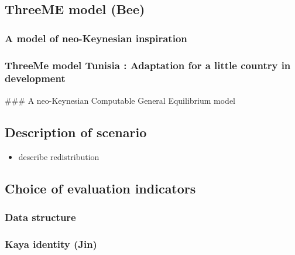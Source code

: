 \documentclass[
]{article}
\providecommand{\tightlist}{%
  \setlength{\itemsep}{0pt}\setlength{\parskip}{0pt}}
\begin{document}
\hypertarget{threeme-model-bee}{%
\subsection{ThreeME model (Bee)}\label{threeme-model-bee}}

\hypertarget{a-model-of-neo-keynesian-inspiration}{%
\subsubsection{A model of neo-Keynesian
inspiration}\label{a-model-of-neo-keynesian-inspiration}}

\hypertarget{threeme-model-tunisia-adaptation-for-a-little-country-in-development}{%
\subsubsection{ThreeMe model Tunisia : Adaptation for a little country
in
development}\label{threeme-model-tunisia-adaptation-for-a-little-country-in-development}}

\#\#\# A neo-Keynesian Computable General Equilibrium model

\hypertarget{description-of-scenario}{%
\subsection{Description of scenario}\label{description-of-scenario}}

\begin{itemize}
\tightlist
\item
  describe redistribution
\end{itemize}

\hypertarget{choice-of-evaluation-indicators}{%
\subsection{Choice of evaluation
indicators}\label{choice-of-evaluation-indicators}}

\hypertarget{data-structure}{%
\subsubsection{Data structure}\label{data-structure}}

\hypertarget{kaya-identity-jin}{%
\subsubsection{Kaya identity (Jin)}\label{kaya-identity-jin}}
\end{document}
